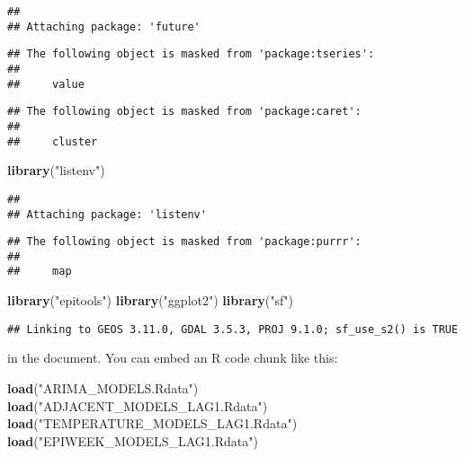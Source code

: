 \documentclass[
]{article}
\newenvironment{Shaded}{\begin{snugshade}}{\end{snugshade}}
\newcommand{\FunctionTok}[1]{\textcolor[rgb]{0.13,0.29,0.53}{\textbf{#1}}}
\newcommand{\NormalTok}[1]{#1}
\newcommand{\StringTok}[1]{\textcolor[rgb]{0.31,0.60,0.02}{#1}}
\begin{document}
\begin{verbatim}
## 
## Attaching package: 'future'
\end{verbatim}

\begin{verbatim}
## The following object is masked from 'package:tseries':
## 
##     value
\end{verbatim}

\begin{verbatim}
## The following object is masked from 'package:caret':
## 
##     cluster
\end{verbatim}

\begin{Shaded}
\begin{Highlighting}[]
\FunctionTok{library}\NormalTok{(}\StringTok{"listenv"}\NormalTok{)}
\end{Highlighting}
\end{Shaded}

\begin{verbatim}
## 
## Attaching package: 'listenv'
\end{verbatim}

\begin{verbatim}
## The following object is masked from 'package:purrr':
## 
##     map
\end{verbatim}

\begin{Shaded}
\begin{Highlighting}[]
\FunctionTok{library}\NormalTok{(}\StringTok{"epitools"}\NormalTok{)}
\FunctionTok{library}\NormalTok{(}\StringTok{"ggplot2"}\NormalTok{)}
\FunctionTok{library}\NormalTok{(}\StringTok{"sf"}\NormalTok{)}
\end{Highlighting}
\end{Shaded}

\begin{verbatim}
## Linking to GEOS 3.11.0, GDAL 3.5.3, PROJ 9.1.0; sf_use_s2() is TRUE
\end{verbatim}

in the document. You can embed an R code chunk like this:

\begin{Shaded}
\begin{Highlighting}[]
\FunctionTok{load}\NormalTok{(}\StringTok{"ARIMA\_MODELS.Rdata"}\NormalTok{)}
\FunctionTok{load}\NormalTok{(}\StringTok{"ADJACENT\_MODELS\_LAG1.Rdata"}\NormalTok{)}
\FunctionTok{load}\NormalTok{(}\StringTok{"TEMPERATURE\_MODELS\_LAG1.Rdata"}\NormalTok{)}
\FunctionTok{load}\NormalTok{(}\StringTok{"EPIWEEK\_MODELS\_LAG1.Rdata"}\NormalTok{)}
\end{Highlighting}
\end{Shaded}
\end{document}

